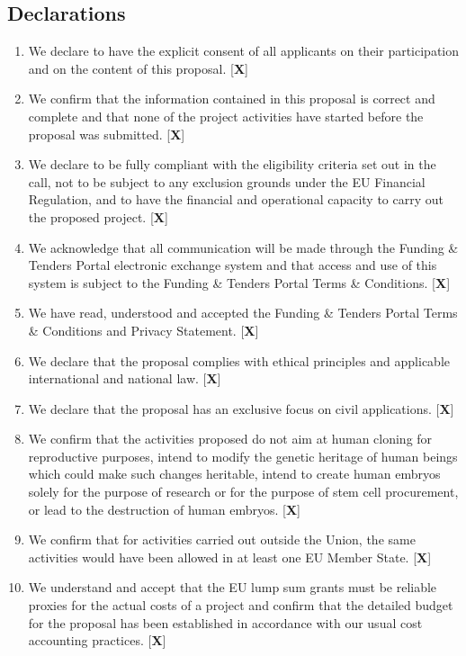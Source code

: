 \documentclass[11pt, a4paper]{article}
\begin{document}
\subsection*{Declarations}
\begin{enumerate}
    \item We declare to have the explicit consent of all applicants on their participation and on the content of this proposal. [\textbf{X}]
    \item We confirm that the information contained in this proposal is correct and complete and that none of the project activities have started before the proposal was submitted. [\textbf{X}]
    \item We declare to be fully compliant with the eligibility criteria set out in the call, not to be subject to any exclusion grounds under the EU Financial Regulation, and to have the financial and operational capacity to carry out the proposed project. [\textbf{X}]
    \item We acknowledge that all communication will be made through the Funding \& Tenders Portal electronic exchange system and that access and use of this system is subject to the Funding \& Tenders Portal Terms \& Conditions. [\textbf{X}]
    \item We have read, understood and accepted the Funding \& Tenders Portal Terms \& Conditions and Privacy Statement. [\textbf{X}]
    \item We declare that the proposal complies with ethical principles and applicable international and national law. [\textbf{X}]
    \item We declare that the proposal has an exclusive focus on civil applications. [\textbf{X}]
    \item We confirm that the activities proposed do not aim at human cloning for reproductive purposes, intend to modify the genetic heritage of human beings which could make such changes heritable, intend to create human embryos solely for the purpose of research or for the purpose of stem cell procurement, or lead to the destruction of human embryos. [\textbf{X}]
    \item We confirm that for activities carried out outside the Union, the same activities would have been allowed in at least one EU Member State. [\textbf{X}]
    \item We understand and accept that the EU lump sum grants must be reliable proxies for the actual costs of a project and confirm that the detailed budget for the proposal has been established in accordance with our usual cost accounting practices. [\textbf{X}]
\end{enumerate}
\end{document}
